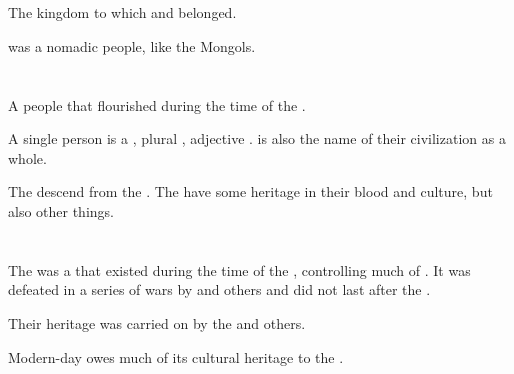 \section{\Imrath}
\index{\Imrath}
The kingdom to which  and  belonged. 

\Imrath{} was a nomadic people, like the Mongols. 
















\section{\Masthenon}
\index{\Masthenon}
A  \scathaese{} people that flourished during the time of the . 

A single person is a \quo{\Masthen}, plural \quo{\Masthenon}, adjective \quo{\Mastheno}. 
 is also the name of their civilization as a whole. 

The  descend from the \Masthenon. 
The  have some \Masthenon{} heritage in their blood and culture, but also other things. 















\section{\Shurco}
\index{\Shurco}
\index{\Shurcarie}
The \Shurcarie{} was a \scathaese{}   that existed during the time of the , controlling much of . 
It was defeated in a series of wars by \VizicarDurasRespina{} and others and did not last after the . 

Their heritage was carried on by the \Ortaicans{} and others. 

Modern-day  owes much of its cultural heritage to the \Shurco.









